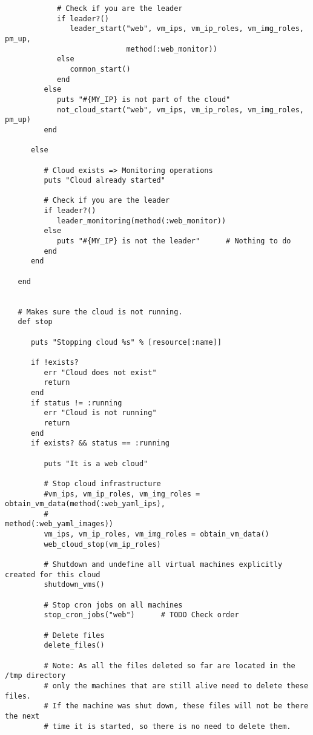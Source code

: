 \begin{lstlisting}
            # Check if you are the leader
            if leader?()
               leader_start("web", vm_ips, vm_ip_roles, vm_img_roles, pm_up,
                            method(:web_monitor))
            else
               common_start()
            end
         else
            puts "#{MY_IP} is not part of the cloud"
            not_cloud_start("web", vm_ips, vm_ip_roles, vm_img_roles, pm_up)
         end
         
      else
         
         # Cloud exists => Monitoring operations
         puts "Cloud already started"
         
         # Check if you are the leader
         if leader?()
            leader_monitoring(method(:web_monitor))
         else
            puts "#{MY_IP} is not the leader"      # Nothing to do
         end
      end
      
   end


   # Makes sure the cloud is not running.
   def stop

      puts "Stopping cloud %s" % [resource[:name]]

      if !exists?
         err "Cloud does not exist"
         return
      end
      if status != :running
         err "Cloud is not running"
         return
      end
      if exists? && status == :running
         
         puts "It is a web cloud"
         
         # Stop cloud infrastructure
         #vm_ips, vm_ip_roles, vm_img_roles = obtain_vm_data(method(:web_yaml_ips),
         #                                                   method(:web_yaml_images))
         vm_ips, vm_ip_roles, vm_img_roles = obtain_vm_data()
         web_cloud_stop(vm_ip_roles)
         
         # Shutdown and undefine all virtual machines explicitly created for this cloud
         shutdown_vms()
         
         # Stop cron jobs on all machines
         stop_cron_jobs("web")      # TODO Check order
         
         # Delete files
         delete_files()
         
         # Note: As all the files deleted so far are located in the /tmp directory
         # only the machines that are still alive need to delete these files.
         # If the machine was shut down, these files will not be there the next
         # time it is started, so there is no need to delete them.
         

\end{lstlisting}
